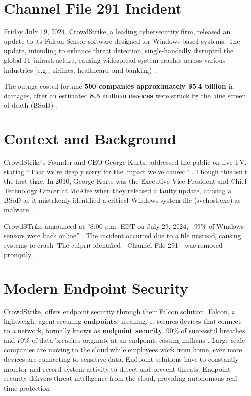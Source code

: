 

\section{Channel File 291 Incident}
\label{sec:crowd}

Friday July 19, 2024, CrowdStrike, a leading cybersecurity firm, released an update to its Falcon Sensor
software designed for Windows-based systems. The update, intending to enhance threat detection, single-handedly
disrupted the global IT infrastructure, causing widespread system crashes across various industries
(e.g., airlines, healthcare, and banking) \cite{crowdstrike2024falcon}.

The outage costed fortune \textbf{500 companies approximately \$5.4 billion} in damages, after an
estimated \textbf{8.5 million devices} were struck by the blue screen of death (BSoD) \cite{tidy_crowdstrike_outage_2024}\cite{kerner_crowdstrike_outage_2024}.

\section{Context and Background}
\label{sec:context}

CrowdStrike's Founder and CEO George Kurtz, addressed the public on live TV, stating ``That we're deeply sorry for the impact we've caused'' \cite{sato_crowdstrike_ceo_2024}.
Though this isn't the first time.
In 2010, George Kurts was the Executive Vice President and Chief Technology Officer at McAfee when they released a faulty update, causing a BSoD
as it mistakenly identified a critical Windows system file (svchost.exe) as malware \cite{volenik_crowdstrike_ceo_2024}.

CrowdSTrike announced at ``8:00 p.m. EDT on July 29, 2024, ~99\% of Windows sensors were back online'' \cite{crowdstrike_channel_file_291_2024}.
The incident occurred due to a file misread, causing systems to crash. The culprit identified---Channel File 291---was removed promptly \cite{crowdstrike_channel_file_291_2024}.

\section{Modern Endpoint Security}
\label{sec:falcon}

CrowdStrike, offers endpoint security through their Falcon solution. Falcon, a lightweight agent securing \textbf{endpoints}, meaning, it secures devices that 
connect to a network, formally known as \textbf{endpoint security}. 90\% of successful breaches and 70\% of data breaches originate at an endpoint, costing millions \cite{ibm_endpoint_security}.
Large scale companies are moving to the cloud while employees work from home, ever more devices are connecting to sensitive data. Endpoint solutions
have to constantly monitor and record system activity to detect and prevent threats. Endpoint security delivers threat intelligence from the cloud, providing autonomous
real-time protection \cite{cisco_endpoint_security}

